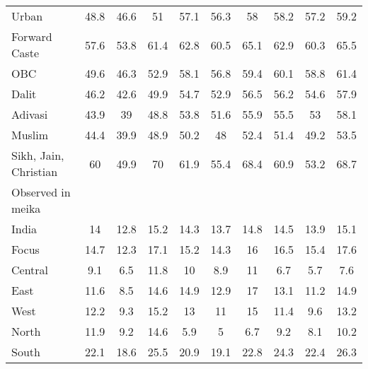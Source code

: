 \begin{tabular}{l*{9}{c}}
Urban               &        48.8&        46.6&          51&        57.1&        56.3&          58&        58.2&        57.2&        59.2\\
Forward Caste       &        57.6&        53.8&        61.4&        62.8&        60.5&        65.1&        62.9&        60.3&        65.5\\
OBC                 &        49.6&        46.3&        52.9&        58.1&        56.8&        59.4&        60.1&        58.8&        61.4\\
Dalit               &        46.2&        42.6&        49.9&        54.7&        52.9&        56.5&        56.2&        54.6&        57.9\\
Adivasi             &        43.9&          39&        48.8&        53.8&        51.6&        55.9&        55.5&          53&        58.1\\
Muslim              &        44.4&        39.9&        48.9&        50.2&          48&        52.4&        51.4&        49.2&        53.5\\
Sikh, Jain, Christian&          60&        49.9&          70&        61.9&        55.4&        68.4&        60.9&        53.2&        68.7\\
\midrule
Observed in meika   &            &            &            &            &            &            &            &            &            \\
India               &          14&        12.8&        15.2&        14.3&        13.7&        14.8&        14.5&        13.9&        15.1\\
Focus               &        14.7&        12.3&        17.1&        15.2&        14.3&          16&        16.5&        15.4&        17.6\\
Central             &         9.1&         6.5&        11.8&          10&         8.9&          11&         6.7&         5.7&         7.6\\
East                &        11.6&         8.5&        14.6&        14.9&        12.9&          17&        13.1&        11.2&        14.9\\
West                &        12.2&         9.3&        15.2&          13&          11&          15&        11.4&         9.6&        13.2\\
North               &        11.9&         9.2&        14.6&         5.9&           5&         6.7&         9.2&         8.1&        10.2\\
South               &        22.1&        18.6&        25.5&        20.9&        19.1&        22.8&        24.3&        22.4&        26.3\\

\end{tabular}

